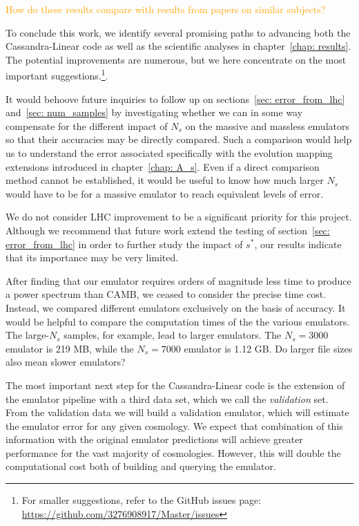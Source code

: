 
\textcolor{orange}{How do these results compare with results from 
papers on similar subjects?}


To conclude this work, we identify several promising paths to advancing
both the Cassandra-Linear code as well as the scientific analyses in
chapter~\ref{chap: results}. The potential improvements are
numerous, but we here concentrate on the most important
suggestions.\footnote{For smaller suggestions, refer to the GitHub issues 
page: \url{https://github.com/3276908917/Master/issues}}.


It would behoove future inquiries to follow up on
sections~\ref{sec: error_from_lhc} and~\ref{sec: num_samples} by investigating 
whether we
can in some way compensate for the different impact of $N_s$ on the massive
and massless emulators so that their accuracies may be directly compared.
Such a comparison would help us to understand the error associated
specifically with the evolution mapping extensions introduced in
chapter~\ref{chap: A_s}. Even if a direct comparison method cannot be
established, it would be useful to know how much larger $N_s$ would have to
be for a massive emulator to reach equivalent levels of error.

We do not consider LHC improvement to be a significant
priority for this project. Although we recommend that future work extend the
testing of section~\ref{sec: error_from_lhc} in order to further study the
impact of $s^*$, our results indicate that its importance may be very limited. 

After finding that our emulator requires orders of magnitude less
time to produce a power spectrum than CAMB, we ceased to consider the precise
time cost. Instead, we compared different emulators exclusively on the
basis of accuracy. It would be helpful to compare the computation times of the
the various emulators. The large-$N_s$ samples, for example, lead to larger
emulators. The $N_s = 3000$ emulator is 219 MB, while the $N_s = 7000$
emulator is 1.12 GB. Do larger file sizes also mean slower emulators?


The most important next step for the Cassandra-Linear code is the
extension of the emulator pipeline with a third data set, which we call the
\textit{validation} set. From the validation data we will build a validation
emulator, which will estimate the emulator error for any given cosmology.
We expect that combination of this information with the original emulator
predictions will achieve greater performance for the vast majority of
cosmologies. However, this will double the
computational cost both of building and querying the emulator.

